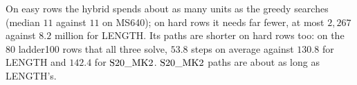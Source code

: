 On easy rows the hybrid spends about as many units as the greedy searches (median $11$ against $11$ on MS640); on
hard rows it needs far fewer, at most $2{,}267$ against $8.2$ million for LENGTH.
Its paths are shorter on hard rows too: on the $80$ ladder100 rows that all three solve, $53.8$ steps on average
against $130.8$ for LENGTH and $142.4$ for $\mathrm{S20\_MK2}$. $\mathrm{S20\_MK2}$ paths are about as long as LENGTH's.
